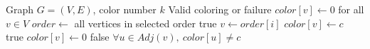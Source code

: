 \documentclass{article}
\begin{document}
\begin{algorithm}[H]
    \caption{Graph Coloring by Backtracking}
    \begin{algorithmic}[1]
    \Require Graph $G=(V,E)$, color number $k$
    \Ensure Valid coloring or failure
    \State $color[v]\gets 0$ for all $v\in V$
    \State $order\gets$ all vertices in selected order
            \State \Return true
        \EndIf
        \State $v\gets order[i]$
                \State $color[v]\gets c$
                    \State \Return true
                \EndIf
                \State $color[v]\gets 0$
            \EndIf
        \EndFor
        \State \Return false
    \EndFunction
        \State \Return $\forall u\in Adj(v),\ color[u]\neq c$
    \EndFunction
    \State \Return {}
    \end{algorithmic}
    \end{algorithm}
\end{document}
